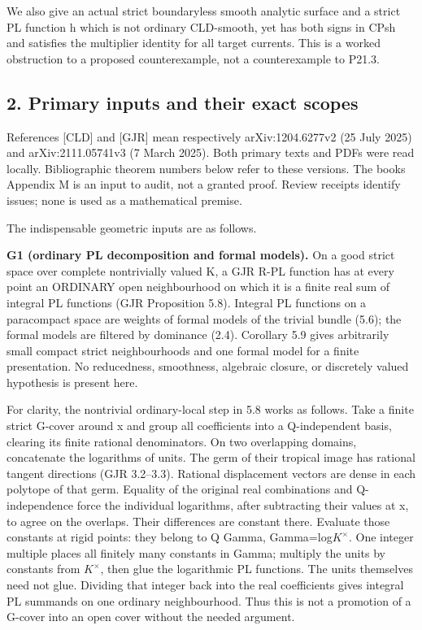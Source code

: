 \documentclass[
  11pt,
]{article}
\begin{document}
We also give an actual strict boundaryless smooth analytic surface and a
strict PL function h which is not ordinary CLD-smooth, yet has both
signs in CPsh and satisfies the multiplier identity for all target
currents. This is a worked obstruction to a proposed counterexample, not
a counterexample to P21.3.

\subsection{2. Primary inputs and their exact
scopes}\label{primary-inputs-and-their-exact-scopes}

References {[}CLD{]} and {[}GJR{]} mean respectively arXiv:1204.6277v2
(25 July 2025) and arXiv:2111.05741v3 (7 March 2025). Both primary texts
and PDFs were read locally. Bibliographic theorem numbers below refer to
these versions. The book\textquotesingle s Appendix M is an input to
audit, not a granted proof. Review receipts identify issues; none is
used as a mathematical premise.

The indispensable geometric inputs are as follows.

\textbf{G1 (ordinary PL decomposition and formal models).} On a good
strict space over complete nontrivially valued K, a GJR R-PL function
has at every point an ORDINARY open neighbourhood on which it is a
finite real sum of integral PL functions (GJR Proposition 5.8). Integral
PL functions on a paracompact space are weights of formal models of the
trivial bundle (5.6); the formal models are filtered by dominance (2.4).
Corollary 5.9 gives arbitrarily small compact strict neighbourhoods and
one formal model for a finite presentation. No reducedness, smoothness,
algebraic closure, or discretely valued hypothesis is present here.

For clarity, the nontrivial ordinary-local step in 5.8 works as follows.
Take a finite strict G-cover around x and group all coefficients into a
Q-independent basis, clearing its finite rational denominators. On two
overlapping domains, concatenate the logarithms of units. The germ of
their tropical image has rational tangent directions (GJR 3.2--3.3).
Rational displacement vectors are dense in each polytope of that germ.
Equality of the original real combinations and Q-independence force the
individual logarithms, after subtracting their values at x, to agree on
the overlaps. Their differences are constant there. Evaluate those
constants at rigid points: they belong to Q Gamma,
Gamma=log\textbar{}\(K^\times\)\textbar. One integer multiple places all
finitely many constants in Gamma; multiply the units by constants from
\(K^\times\), then glue the logarithmic PL functions. The units themselves
need not glue. Dividing that integer back into the real
coefficients gives integral PL summands on one ordinary neighbourhood.
Thus this is not a promotion of a G-cover into an open cover without the
needed argument.
\end{document}
